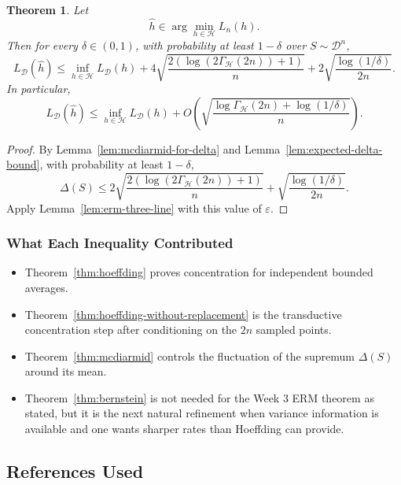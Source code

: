 \documentclass{article}
\newtheorem{theorem}{Theorem}[section]
\theoremstyle{definition}
\theoremstyle{remark}
\newcommand{\cH}{\mathcal{H}}
\newcommand{\cD}{\mathcal{D}}
\begin{document}
\begin{theorem}
\label{thm:hw3-growth-erm}
Let
$$
\widehat{h} \in \arg\min_{h\in\cH} L_n(h).
$$
Then for every $\delta \in (0,1)$, with probability at least $1-\delta$ over $S\sim \cD^n$,
$$
L_{\cD}(\widehat{h})
\le
\inf_{h\in\cH} L_{\cD}(h)
+ 4\sqrt{
\frac{2(\log(2\Gamma_{\cH}(2n))+1)}{n}
}
+ 2\sqrt{\frac{\log(1/\delta)}{2n}}.
$$
In particular,
$$
L_{\cD}(\widehat{h})
\le
\inf_{h\in\cH} L_{\cD}(h)
+ O\!\left(
\sqrt{\frac{\log \Gamma_{\cH}(2n)+\log(1/\delta)}{n}}
\right).
$$
\end{theorem}

\begin{proof}
By Lemma~\ref{lem:mcdiarmid-for-delta} and Lemma~\ref{lem:expected-delta-bound}, with probability at least $1-\delta$,
$$
\Delta(S)
\le
2\sqrt{
\frac{2(\log(2\Gamma_{\cH}(2n))+1)}{n}
}
+ \sqrt{\frac{\log(1/\delta)}{2n}}.
$$
Apply Lemma~\ref{lem:erm-three-line} with this value of $\varepsilon$.
\end{proof}

\subsubsection{What Each Inequality Contributed}

\begin{itemize}
\item Theorem~\ref{thm:hoeffding} proves concentration for independent bounded averages.
\item Theorem~\ref{thm:hoeffding-without-replacement} is the transductive concentration step after conditioning on the $2n$ sampled points.
\item Theorem~\ref{thm:mcdiarmid} controls the fluctuation of the supremum $\Delta(S)$ around its mean.
\item Theorem~\ref{thm:bernstein} is not needed for the Week 3 ERM theorem as stated, but it is the next natural refinement when variance information is available and one wants sharper rates than Hoeffding can provide.
\end{itemize}

\subsection{References Used}
\end{document}
